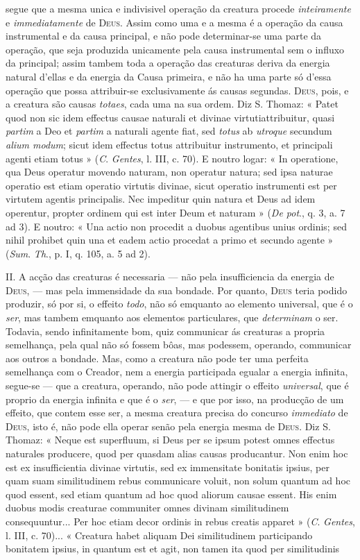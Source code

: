 segue que a mesma unica e indivisivel operação da creatura procede \emph{inteiramente} e \emph{immediatamente} de \textsc{Deus}. Assim como uma e a mesma é a operação da causa instrumental e da causa principal, e não pode determinar-se uma parte da operação, que seja produzida unicamente pela causa instrumental sem o influxo da principal; assim tambem toda a operação das creaturas deriva da energia natural d'ellas e da energia da Causa primeira, e não ha uma parte só d'essa operação que possa attribuir-se exclusivamente ás causas segundas. \textsc{Deus}, pois, e a creatura são causas \emph{totaes}, cada uma na sua ordem. Diz S. Thomaz: « Patet quod non sic idem effectus causae naturali et divinae virtutiattribuitur, quasi \emph{partim} a Deo et \emph{partim} a naturali agente fiat, sed \emph{totus} ab \emph{utroque} secundum \emph{alium modum}; sicut idem effectus totus attribuitur instrumento, et principali agenti etiam totus » (\emph{C}. \emph{Gentes}, l. III, c. 70). E noutro logar: « In operatione, qua Deus operatur movendo naturam, non operatur natura; sed ipsa naturae operatio est etiam operatio virtutis divinae, sicut operatio instrumenti est per virtutem agentis principalis. Nec impeditur quin natura et Deus ad idem operentur, propter ordinem qui est inter Deum et naturam » (\emph{De pot}., q. 3, a. 7 ad 3). E noutro: « Una actio non procedit a duobus agentibus unius ordinis; sed nihil prohibet quin una et eadem actio procedat a primo et secundo agente » (\emph{Sum}. \emph{Th}., p. I, q. 105, a. 5 ad 2).\par II. A acção das creaturas é necessaria --- não pela insufficiencia da energia de \textsc{Deus}, --- mas pela immensidade da sua bondade. Por quanto, \textsc{Deus} teria podido produzir, só por si, o effeito \emph{todo}, não só emquanto ao elemento universal, que é o \emph{ser}, mas tambem emquanto aos elementos particulares, que \emph{determinam} o ser. Todavia, sendo infinitamente bom, quiz communicar ás creaturas a propria semelhança, pela qual não só fossem bôas, mas podessem, operando, communicar aos outros a bondade. Mas, como a creatura não pode ter uma perfeita semelhança com o Creador, nem a energia participada egualar a energia infinita, segue-se --- que a creatura, operando, não pode attingir o effeito \emph{universal}, que é proprio da energia infinita e que é o \emph{ser}, --- e que por isso, na producção de um effeito, que contem esse ser, a mesma creatura precisa do concurso \emph{immediato} de \textsc{Deus}, isto é, não pode ella operar senão pela energia mesma de \textsc{Deus}. Diz S. Thomaz: « Neque est superfluum, si Deus per se ipsum potest omnes effectus naturales producere, quod per quasdam alias causas producantur. Non enim hoc est ex insufficientia divinae virtutis, sed ex immensitate bonitatis ipsius, per quam suam similitudinem rebus communicare voluit, non solum quantum ad hoc quod essent, sed etiam quantum ad hoc quod aliorum causae essent. His enim duobus modis creaturae communiter omnes divinam similitudinem consequuntur... Per hoc etiam decor ordinis in rebus creatis apparet » (\emph{C}. \emph{Gentes}, l. III, c. 70)... « Creatura habet aliquam Dei similitudinem participando bonitatem ipsius, in quantum est et agit, non tamen ita quod per similitudinis 